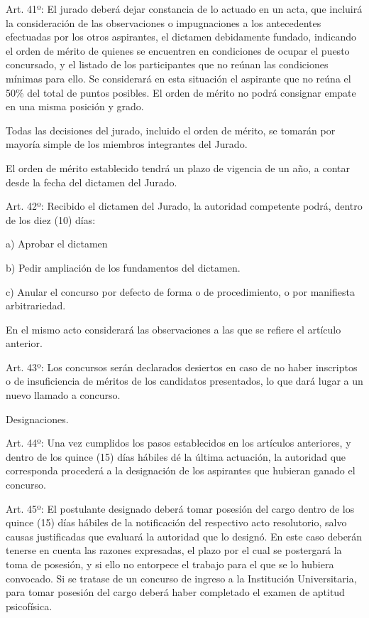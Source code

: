 \documentclass[]{article}
\begin{document}
Art. 41º: El jurado deberá dejar constancia de lo actuado en un acta,
que incluirá la consideración de las observaciones o impugnaciones a los
antecedentes efectuadas por los otros aspirantes, el dictamen
debidamente fundado, indicando el orden de mérito de quienes se
encuentren en condiciones de ocupar el puesto concursado, y el listado
de los participantes que no reúnan las condiciones mínimas para ello. Se
considerará en esta situación el aspirante que no reúna el 50\% del
total de puntos posibles. El orden de mérito no podrá consignar empate
en una misma posición y grado.

Todas las decisiones del jurado, incluido el orden de mérito, se tomarán
por mayoría simple de los miembros integrantes del Jurado.

El orden de mérito establecido tendrá un plazo de vigencia de un año, a
contar desde la fecha del dictamen del Jurado.

Art. 42º: Recibido el dictamen del Jurado, la autoridad competente
podrá, dentro de los diez (10) días:

a) Aprobar el dictamen

b) Pedir ampliación de los fundamentos del dictamen.

c) Anular el concurso por defecto de forma o de procedimiento, o por
manifiesta arbitrariedad.

En el mismo acto considerará las observaciones a las que se refiere el
artículo anterior.

Art. 43º: Los concursos serán declarados desiertos en caso de no haber
inscriptos o de insuficiencia de méritos de los candidatos presentados,
lo que dará lugar a un nuevo llamado a concurso.

Designaciones.

Art. 44º: Una vez cumplidos los pasos establecidos en los artículos
anteriores, y dentro de los quince (15) días hábiles dé la última
actuación, la autoridad que corresponda procederá a la designación de
los aspirantes que hubieran ganado el concurso.

Art. 45º: El postulante designado deberá tomar posesión del cargo dentro
de los quince (15) días hábiles de la notificación del respectivo acto
resolutorio, salvo causas justificadas que evaluará la autoridad que lo
designó. En este caso deberán tenerse en cuenta las razones expresadas,
el plazo por el cual se postergará la toma de posesión, y si ello no
entorpece el trabajo para el que se lo hubiera convocado. Si se tratase
de un concurso de ingreso a la Institución Universitaria, para tomar
posesión del cargo deberá haber completado el examen de aptitud
psicofísica.
\end{document}
